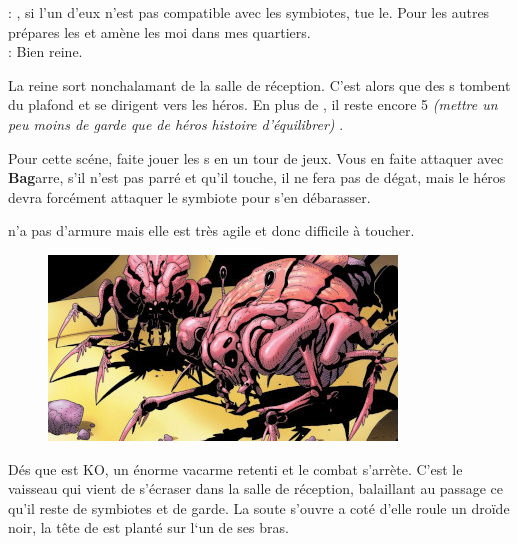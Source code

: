 \begin{quotebox}
\noindent\textbf{}: , si l’un d’eux n’est pas compatible avec les symbiotes, tue le. Pour les autres prépares les et amène les moi dans mes quartiers.\\
\noindent\textbf{}: Bien reine.
\end{quotebox}
La reine sort nonchalamant de la salle de réception. C’est alors que des s tombent du plafond et se dirigent vers les héros. En plus de , il reste encore 5 \textit{(mettre un peu moins de garde que de héros histoire d’équilibrer)} .

Pour cette scéne, faite jouer les s en un tour de jeux. Vous en faite attaquer avec \textbf{Bag}arre, s’il n’est pas parré et qu’il touche, il ne fera pas de dégat, mais le héros devra forcément attaquer le symbiote pour s’en débarasser.

 n’a pas d’armure mais elle est très agile et donc difficile à toucher.

\begin{figure}[h]
\noindent\includegraphics[width=\linewidth]{_img/bestiary/symbiote-abersyn.jpg}
\caption{}
\end{figure}
Dés que  est KO, un énorme vacarme retenti et le combat s’arrète. C’est le vaisseau  qui vient de s’écraser dans la salle de réception, balaillant au passage ce qu’il reste de symbiotes et de garde. 
La soute s’ouvre  a coté d’elle roule un droïde noir, la tête de  est planté sur l‘un de ses bras.


